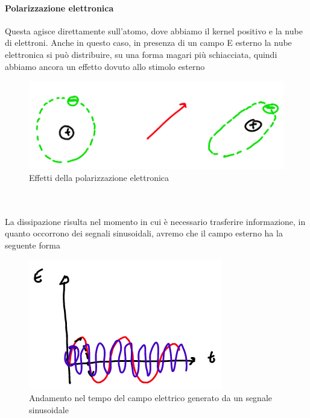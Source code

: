 \documentclass[oneside, 12pt]{extbook}
\begin{document}
\paragraph{Polarizzazione elettronica}
Questa agisce direttamente sull'atomo, dove abbiamo il kernel positivo e la nube di elettroni. Anche in questo caso, in presenza di un campo E esterno la nube elettronica si può distribuire, su una forma magari più schiacciata, quindi abbiamo ancora un effetto dovuto allo stimolo esterno
\begin{figure}[!h]
	\includegraphics[scale=0.6]{immagini/pol_elettr_effetto.png}
	\caption{Effetti della polarizzazione elettronica}
\end{figure}
\\\\La dissipazione risulta nel momento in cui è necessario trasferire informazione, in quanto occorrono dei segnali sinusoidali, avremo che il campo esterno ha la seguente forma
\begin{figure}[!h]
	\includegraphics[scale=0.7]{immagini/appl_ce.png}
	\caption{Andamento nel tempo del campo elettrico generato da un segnale sinusoidale}
\end{figure}
\end{document}
